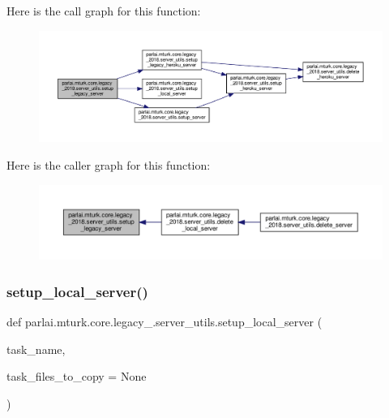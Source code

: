 Here is the call graph for this function\+:
\nopagebreak
\begin{figure}[H]
\begin{center}
\leavevmode
\includegraphics[width=350pt]{namespaceparlai_1_1mturk_1_1core_1_1legacy__2018_1_1server__utils_ace7161b60dc11e273f8da7ef409abadf_cgraph}
\end{center}
\end{figure}
Here is the caller graph for this function\+:
\nopagebreak
\begin{figure}[H]
\begin{center}
\leavevmode
\includegraphics[width=350pt]{namespaceparlai_1_1mturk_1_1core_1_1legacy__2018_1_1server__utils_ace7161b60dc11e273f8da7ef409abadf_icgraph}
\end{center}
\end{figure}
\mbox{\label{namespaceparlai_1_1mturk_1_1core_1_1legacy__2018_1_1server__utils_a2710ac8519a6de20fcc29417582545e6}} 
\subsubsection{\texorpdfstring{setup\+\_\+local\+\_\+server()}{setup\_local\_server()}}
{\footnotesize\ttfamily def parlai.\+mturk.\+core.\+legacy\+\_.\+server\+\_\+utils.\+setup\+\_\+local\+\_\+server (\begin{DoxyParamCaption}\item[{}]{task\+\_\+name,  }\item[{}]{task\+\_\+files\+\_\+to\+\_\+copy = {\ttfamily None} }\end{DoxyParamCaption})}



